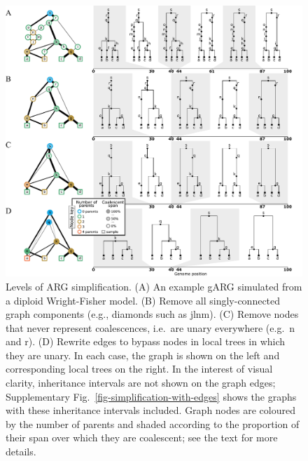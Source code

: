 \documentclass{article}
\newcommand{\noderef}[1]{\textsf{#1}}
\begin{document}
\begin{figure}
\centering
\includegraphics[width=\textwidth]{illustrations/simplification}
\caption{\label{fig-simplification}
Levels of ARG simplification.
(A) An example gARG simulated from a diploid Wright-Fisher model.
(B) Remove all
singly-connected graph components (e.g., diamonds such as \noderef{jlnm}).
(C) Remove nodes that never represent coalescences,
i.e.\ are unary everywhere (e.g.\ \noderef{n} and \noderef{r}).
(D) Rewrite edges to bypass nodes in local trees in which they are unary.
In each case, the graph is shown on the left
and corresponding local trees on the right.
In the interest of visual clarity, inheritance intervals are not shown
on the graph edges; Supplementary Fig.~\ref{fig-simplification-with-edges}
shows the graphs with these inheritance intervals included.
Graph nodes are coloured by the number of parents and shaded
according to the proportion of their span over which they are coalescent;
see the text for more details.
}
\end{figure}
\end{document}
